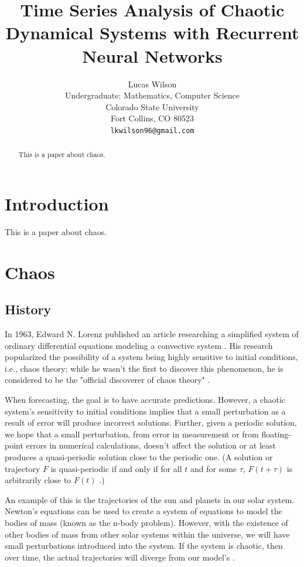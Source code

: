 \documentclass{article}
\title{Time Series Analysis of Chaotic Dynamical Systems with Recurrent Neural Networks}
\author{
  Lucas Wilson \\
  Undergraduate: Mathematics, Computer Science \\
  Colorado State University\\
  Fort Collins, CO 80523 \\
  \texttt{lkwilson96@gmail.com} \\
}
\begin{document}
\maketitle

\begin{abstract}
This is a paper about chaos.
\end{abstract}

\section{Introduction}

This is a paper about chaos.

\section{Chaos}

\subsection{History}

In 1963, Edward N. Lorenz published an article researching a simplified system of 
ordinary differential equations modeling a convective system \cite{lorenz1963deterministic}. His 
research popularized the possibility of a system being highly sensitive to 
initial conditions, i.e., chaos theory; while he wasn't the first to discover 
this phenomenon, he is considered to be the "official discoverer of chaos 
theory" \cite{oestreicher2007history}.

When forecasting, the goal is to have accurate predictions. However, 
a chaotic system's sensitivity to initial conditions implies that a small 
perturbation as a result of error will produce incorrect solutions.
Further, given a periodic
solution, we hope that a small perturbation, from error in measurement or from 
floating-point errors in numerical calculations, doesn't affect the solution or 
at least produces a quasi-periodic solution close to the periodic one. 
(A solution or trajectory $F$ 
is quasi-periodic if and only if for all $t$ and for some $\tau$, $F(t+\tau)$ 
is arbitrarily close to $F(t)$ \cite{lorenz1963deterministic}.)

An example of this is the trajectories of the sun and planets in our solar 
system. Newton's equations can be used to create a system of equations to model 
the bodies of mass (known as the n-body problem). However, with the existence of
other bodies of mass from other solar systems within the universe, we will have 
small perturbations introduced into the system. If the system is chaotic, then 
over time, the actual trajectories will diverge from our model's 
\cite{oestreicher2007history}. 
\end{document}
